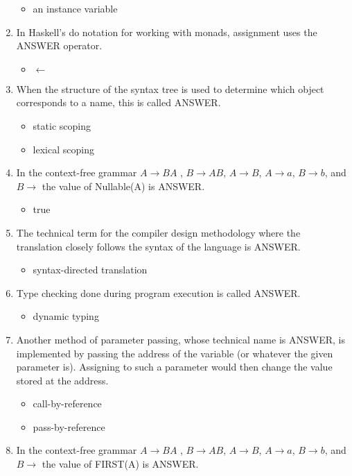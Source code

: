 \documentclass{exam}
\begin{document}
\begin{enumerate}
\begin{itemize}
\item an instance variable
\end{itemize}
\item In Haskell's do notation for working with monads, assignment uses the ANSWER operator.
\begin{itemize}
\item $\leftarrow$
\end{itemize}
\item When the structure of the syntax tree is used to determine which object corresponds to a name, this is called ANSWER.
\begin{itemize}
\item static scoping
\item lexical scoping
\end{itemize}
\item In the context-free grammar $A \rightarrow B A$ , $B \rightarrow A B$, $A \rightarrow B$, $A \rightarrow a$, $B \rightarrow b$, and $B \rightarrow$  the value of Nullable(A) is ANSWER.
\begin{itemize}
\item true
\end{itemize}
\item The technical term for the compiler design methodology where the translation closely follows the syntax of the language is ANSWER.
\begin{itemize}
\item syntax-directed translation
\end{itemize}
\item Type checking done during program execution is called ANSWER.
\begin{itemize}
\item dynamic typing
\end{itemize}
\item Another method of parameter passing, whose technical name is ANSWER, is implemented by passing the address of the variable (or whatever the given parameter is).  Assigning to such a parameter would then change the value stored at the address.
\begin{itemize}
\item call-by-reference
\item pass-by-reference
\end{itemize}
\item In the context-free grammar $A \rightarrow B A$ , $B \rightarrow A B$, $A \rightarrow B$, $A \rightarrow a$, $B \rightarrow b$, and $B \rightarrow$  the value of FIRST(A) is ANSWER.

\end{enumerate}
\end{document}

